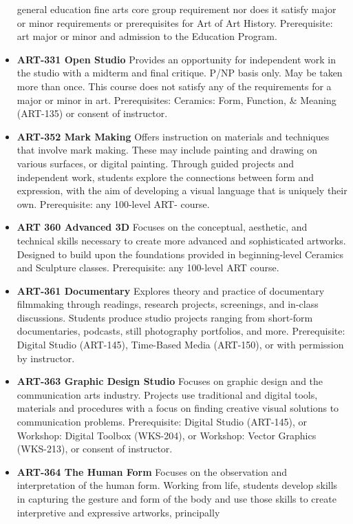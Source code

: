 \documentclass[
  letterpaper,
]{scrbook}
\begin{document}
\begin{itemize}
  general education fine arts core group requirement nor does it satisfy
  major or minor requirements or prerequisites for Art of Art History.
  Prerequisite: art major or minor and admission to the Education
  Program.
\item
  \textbf{ART-331 Open Studio} Provides an opportunity for independent
  work in the studio with a midterm and final critique. P/NP basis only.
  May be taken more than once. This course does not satisfy any of the
  requirements for a major or minor in art. Prerequisites: Ceramics:
  Form, Function, \& Meaning (ART-135) or consent of instructor.
\item
  \textbf{ART-352 Mark Making} Offers instruction on materials and
  techniques that involve mark making. These may include painting and
  drawing on various surfaces, or digital painting. Through guided
  projects and independent work, students explore the connections
  between form and expression, with the aim of developing a visual
  language that is uniquely their own. Prerequisite: any 100-level ART-
  course.
\item
  \textbf{ART 360 Advanced 3D} Focuses on the conceptual, aesthetic, and
  technical skills necessary to create more advanced and sophisticated
  artworks. Designed to build upon the foundations provided in
  beginning-level Ceramics and Sculpture classes. Prerequisite: any
  100-level ART course.
\item
  \textbf{ART-361 Documentary} Explores theory and practice of
  documentary filmmaking through readings, research projects,
  screenings, and in-class discussions. Students produce studio projects
  ranging from short-form documentaries, podcasts, still photography
  portfolios, and more. Prerequisite: Digital Studio (ART-145),
  Time-Based Media (ART-150), or with permission by instructor.
\item
  \textbf{ART-363 Graphic Design Studio} Focuses on graphic design and
  the communication arts industry. Projects use traditional and digital
  tools, materials and procedures with a focus on finding creative
  visual solutions to communication problems. Prerequisite: Digital
  Studio (ART-145), or Workshop: Digital Toolbox (WKS-204), or Workshop:
  Vector Graphics (WKS-213), or consent of instructor.
\item
  \textbf{ART-364 The Human Form} Focuses on the observation and
  interpretation of the human form. Working from life, students develop
  skills in capturing the gesture and form of the body and use those
  skills to create interpretive and expressive artworks, principally

\end{itemize}
\end{document}
